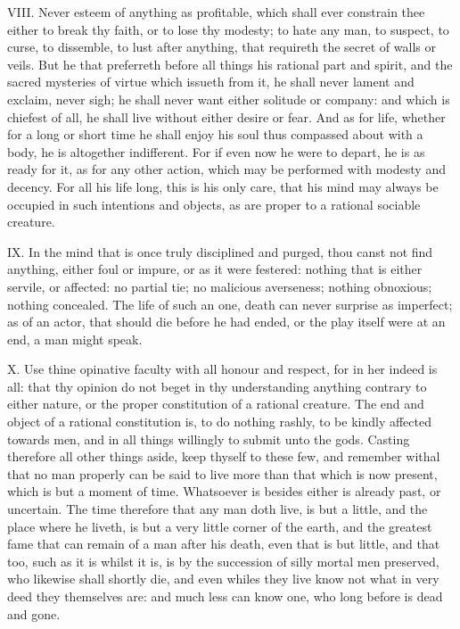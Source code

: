 VIII. Never esteem of anything as profitable, which shall ever constrain
thee either to break thy faith, or to lose thy modesty; to hate any man,
to suspect, to curse, to dissemble, to lust after anything, that requireth
the secret of walls or veils. But he that preferreth before all things his
rational part and spirit, and the sacred mysteries of virtue which issueth
from it, he shall never lament and exclaim, never sigh; he shall never
want either solitude or company: and which is chiefest of all, he shall
live without either desire or fear. And as for life, whether for a long or
short time he shall enjoy his soul thus compassed about with a body, he is
altogether indifferent. For if even now he were to depart, he is as ready
for it, as for any other action, which may be performed with modesty and
decency. For all his life long, this is his only care, that his mind may
always be occupied in such intentions and objects, as are proper to a
rational sociable creature.

IX. In the mind that is once truly disciplined and purged, thou canst
not find anything, either foul or impure, or as it were festered: nothing
that is either servile, or affected: no partial tie; no malicious
averseness; nothing obnoxious; nothing concealed. The life of such an one,
death can never surprise as imperfect; as of an actor, that should die
before he had ended, or the play itself were at an end, a man might speak.

X. Use thine opinative faculty with all honour and respect, for in
her indeed is all: that thy opinion do not beget in thy understanding
anything contrary to either nature, or the proper constitution of a
rational creature. The end and object of a rational constitution is, to do
nothing rashly, to be kindly affected towards men, and in all things
willingly to submit unto the gods. Casting therefore all other things
aside, keep thyself to these few, and remember withal that no man properly
can be said to live more than that which is now present, which is but a
moment of time. Whatsoever is besides either is already past, or
uncertain. The time therefore that any man doth live, is but a little, and
the place where he liveth, is but a very little corner of the earth, and
the greatest fame that can remain of a man after his death, even that is
but little, and that too, such as it is whilst it is, is by the succession
of silly mortal men preserved, who likewise shall shortly die, and even
whiles they live know not what in very deed they themselves are: and much
less can know one, who long before is dead and gone.

